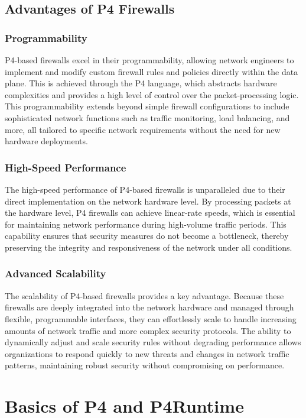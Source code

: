 \subsection{Advantages of P4 Firewalls}
\subsubsection{Programmability}
P4-based firewalls excel in their programmability, allowing network engineers to implement and modify custom firewall rules and policies directly within the data plane. This is achieved through the P4 language, which abstracts hardware complexities and provides a high level of control over the packet-processing logic. This programmability extends beyond simple firewall configurations to include sophisticated network functions such as traffic monitoring, load balancing, and more, all tailored to specific network requirements without the need for new hardware deployments.
\subsubsection{High-Speed Performance}
The high-speed performance of P4-based firewalls is unparalleled due to their direct implementation on the network hardware level. By processing packets at the hardware level, P4 firewalls can achieve linear-rate speeds, which is essential for maintaining network performance during high-volume traffic periods. This capability ensures that security measures do not become a bottleneck, thereby preserving the integrity and responsiveness of the network under all conditions.
\subsubsection{Advanced Scalability}
The scalability of P4-based firewalls provides a key advantage. Because these firewalls are deeply integrated into the network hardware and managed through flexible, programmable interfaces, they can effortlessly scale to handle increasing amounts of network traffic and more complex security protocols. The ability to dynamically adjust and scale security rules without degrading performance allows organizations to respond quickly to new threats and changes in network traffic patterns, maintaining robust security without compromising on performance.


\section{Basics of P4 and P4Runtime}
